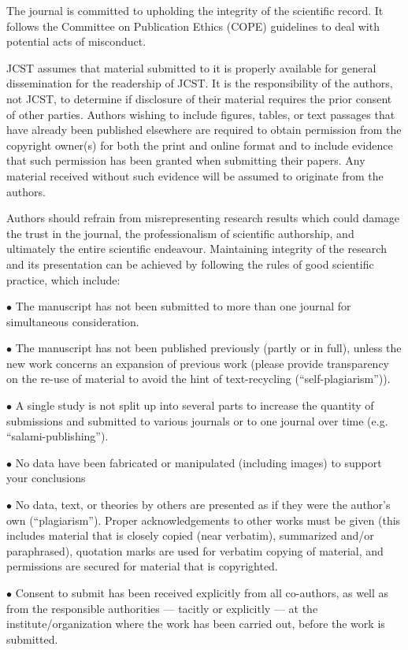 \documentclass[twoside]{article}
\begin{document}
\begin{multicols}{2}
The journal is committed to upholding the integrity of the scientific record. It follows the Committee on Publication Ethics (COPE) guidelines to deal with potential acts of misconduct.

JCST assumes that material submitted to it is properly available for general dissemination for the readership of JCST. It is the responsibility of the authors, not JCST, to determine if disclosure of their material requires the prior consent of other parties. Authors wishing to include figures, tables, or text passages that have already been published elsewhere are required to obtain permission from the copyright owner(s) for both the print and online format and to include evidence that such permission has been granted when submitting their papers. Any material received without such evidence will be assumed to originate from the authors.

Authors should refrain from misrepresenting research results which could damage the trust in the journal, the professionalism of scientific authorship, and ultimately the entire scientific endeavour. Maintaining integrity of the research and its presentation can be achieved by following the rules of good scientific practice, which include:

$\bullet$ The manuscript has not been submitted to more than one journal for simultaneous consideration.

$\bullet$ The manuscript has not been published previously (partly or in full), unless the new work concerns an expansion of previous work (please provide transparency on the re-use of material to avoid the hint of text-recycling (``self-plagiarism'')).

$\bullet$ A single study is not split up into several parts to increase the quantity of submissions and submitted to various journals or to one journal over time (e.g. ``salami-publishing'').

$\bullet$ No data have been fabricated or manipulated (including images) to support your conclusions

$\bullet$ No data, text, or theories by others are presented as if they were the author's own (``plagiarism''). Proper acknowledgements to other works must be given (this includes material that is closely copied (near verbatim), summarized and/or paraphrased), quotation marks are used for verbatim copying of material, and permissions are secured for material that is copyrighted.

$\bullet$ Consent to submit has been received explicitly from all co-authors, as well as from the responsible authorities --- tacitly or explicitly --- at the institute/organization where the work has been carried out, before the work is submitted.


\end{multicols}
\end{document}

